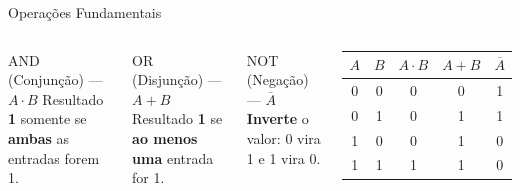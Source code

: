 \documentclass[9pt]{beamer}
\begin{document}
\begin{frame}{Operações Fundamentais}

\begin{columns}


\begin{block}{AND (Conjunção) — $A \cdot B$}
Resultado \textbf{1} somente se \textbf{ambas} as entradas forem 1.
\end{block}

\vspace{0.2cm}

\begin{block}{OR (Disjunção) — $A + B$}
Resultado \textbf{1} se \textbf{ao menos uma} entrada for 1.
\end{block}

\vspace{0.2cm}

\begin{block}{NOT (Negação) — $\overline{A}$}
\textbf{Inverte} o valor: 0 vira 1 e 1 vira 0.
\end{block}


\begin{center}
\renewcommand{\arraystretch}{1.2}
\begin{tabular}{|c|c|c|c|c|}
\hline
$A$ & $B$ & $A \cdot B$ & $A + B$ & $\overline{A}$ \\
\hline
0 & 0 & \alert{0} & \alert{0} & 1 \\
0 & 1 & \alert{0} & \alert{1} & 1 \\
1 & 0 & \alert{0} & \alert{1} & 0 \\
1 & 1 & \alert{1} & \alert{1} & 0 \\
\hline
\end{tabular}

\vspace{0.4cm}

\end{center}
\end{columns}
\end{frame}
\end{document}

